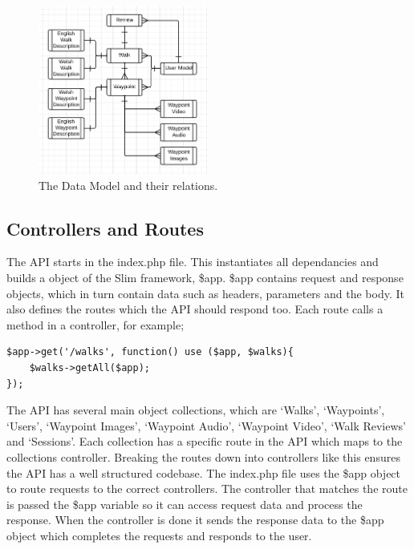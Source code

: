 \documentclass[11pt,a4paper]{report}
\begin{document}
\begin{figure}[H]
    \centering
    \includegraphics[width=0.5\textwidth]{DataModels}
    \caption{The Data Model and their relations.}
    \label{fig:datamodels}
\end{figure}


\subsection{Controllers and Routes}
The API starts in the index.php file. This instantiates all dependancies and builds a object of the Slim framework, \$app. \$app contains request and response objects, which in turn contain data such as headers, parameters and the body. It also defines the routes which the API should respond too. Each route calls a method in a controller, for example;

\begin{lstlisting}[captionpos=b, caption=A basic route for /walks, label=lst:walks, frame=single]
$app->get('/walks', function() use ($app, $walks){
 	$walks->getAll($app);
});
\end{lstlisting}

The API has several main object collections, which are `Walks', `Waypoints', `Users', `Waypoint Images', `Waypoint Audio', `Waypoint Video', `Walk Reviews' and `Sessions'. Each collection has a specific route in the API which maps to the collections controller. Breaking the routes down into controllers like this ensures the API has a well structured codebase. The index.php file uses the \$app object to route requests to the correct controllers. The controller that matches the route is passed the \$app variable so it can access request data and process the response. When the controller is done it sends the response data to the \$app object which completes the requests and responds to the user. 
\end{document}
